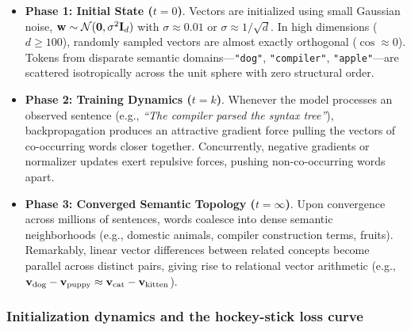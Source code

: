 \documentclass[../../main.tex]{subfiles}
\begin{document}
\begin{itemize}
    \item \textbf{Phase 1: Initial State ($t = 0$)}. Vectors are initialized using small Gaussian noise, $\mathbf{w} \sim \mathcal{N}(\mathbf{0}, \sigma^2 \mathbf{I}_d)$ with $\sigma \approx 0.01$ or $\sigma \approx 1/\sqrt{d}$. In high dimensions ($d \ge 100$), randomly sampled vectors are almost exactly orthogonal ($\cos \approx 0$). Tokens from disparate semantic domains---\texttt{"dog"}, \texttt{"compiler"}, \texttt{"apple"}---are scattered isotropically across the unit sphere with zero structural order.
    
    \item \textbf{Phase 2: Training Dynamics ($t = k$)}. Whenever the model processes an observed sentence (e.g., \emph{``The compiler parsed the syntax tree''}), backpropagation produces an attractive gradient force pulling the vectors of co-occurring words closer together. Concurrently, negative gradients or normalizer updates exert repulsive forces, pushing non-co-occurring words apart.
    
    \item \textbf{Phase 3: Converged Semantic Topology ($t = \infty$)}. Upon convergence across millions of sentences, words coalesce into dense semantic neighborhoods (e.g., domestic animals, compiler construction terms, fruits). Remarkably, linear vector differences between related concepts become parallel across distinct pairs, giving rise to relational vector arithmetic (e.g., $\mathbf{v}_{\text{dog}} - \mathbf{v}_{\text{puppy}} \approx \mathbf{v}_{\text{cat}} - \mathbf{v}_{\text{kitten}}$).
\end{itemize}

\subsubsection{Initialization dynamics and the hockey-stick loss curve}
\label{subsec:initialization_dynamics}
\end{document}
